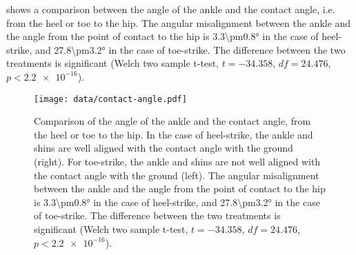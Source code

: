  shows a comparison between the angle of the ankle and the contact angle, i.e. from the heel or toe to the hip. The angular misalignment between the ankle and the angle from the point of contact to the hip is \ang{3.3\pm0.8} in the case of heel-strike, and \ang{27.8\pm3.2} in the case of toe-strike. The difference between the two treatments is significant (Welch two sample t-test, $t=-34.358$, $df=24.476$, $p<\num{2.2e-16}$).
\begin{figure}
\begin{center}
\texttt{[image: data/contact-angle.pdf]}
\end{center}
\caption{Comparison of the angle of the ankle and the contact angle, from the heel or toe to the hip. In the case of heel-strike, the ankle and shins are well aligned with the contact angle with the ground (right). For toe-strike, the ankle and shins are not well aligned with the contact angle with the ground (left). The angular misalignment between the ankle and the angle from the point of contact to the hip is \ang{3.3\pm0.8} in the case of heel-strike, and \ang{27.8\pm3.2} in the case of toe-strike. The difference between the two treatments is significant (Welch two sample t-test, $t=-34.358$, $df=24.476$, $p<\num{2.2e-16}$).} 
\label{fig:results:contactangles}
\end{figure}
